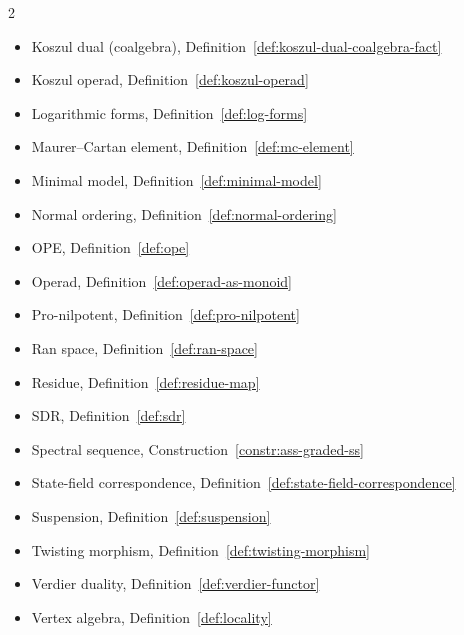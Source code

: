 \begin{multicols}{2}
\begin{itemize}[leftmargin=*, itemsep=0pt]
\item Koszul dual (coalgebra), Definition~\ref{def:koszul-dual-coalgebra-fact}
\item Koszul operad, Definition~\ref{def:koszul-operad}
\item Logarithmic forms, Definition~\ref{def:log-forms}
\item Maurer--Cartan element, Definition~\ref{def:mc-element}
\item Minimal model, Definition~\ref{def:minimal-model}
\item Normal ordering, Definition~\ref{def:normal-ordering}
\item OPE, Definition~\ref{def:ope}
\item Operad, Definition~\ref{def:operad-as-monoid}
\item Pro-nilpotent, Definition~\ref{def:pro-nilpotent}
\item Ran space, Definition~\ref{def:ran-space}
\item Residue, Definition~\ref{def:residue-map}
\item SDR, Definition~\ref{def:sdr}
\item Spectral sequence, Construction~\ref{constr:ass-graded-ss}
\item State-field correspondence, Definition~\ref{def:state-field-correspondence}
\item Suspension, Definition~\ref{def:suspension}
\item Twisting morphism, Definition~\ref{def:twisting-morphism}
\item Verdier duality, Definition~\ref{def:verdier-functor}
\item Vertex algebra, Definition~\ref{def:locality}
\end{itemize}
\end{multicols}
